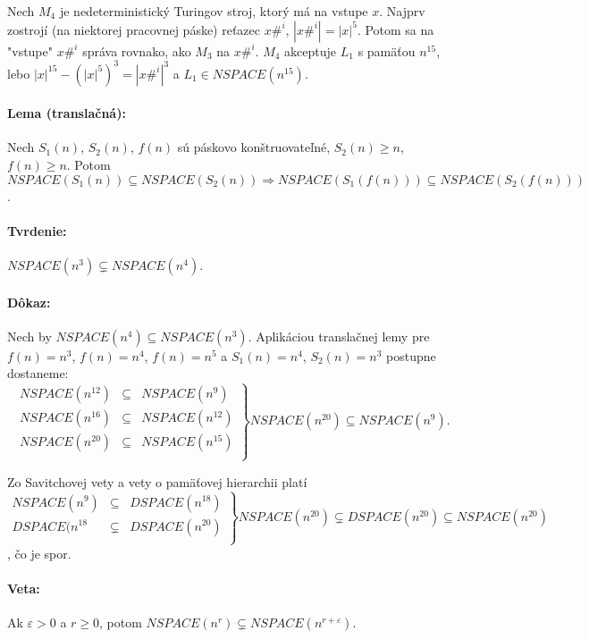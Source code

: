 \documentclass{article}
\begin{document}
\par Nech $M_4$ je nedeterministický Turingov stroj, ktorý má na vstupe $x$.
Najprv zostrojí (na niektorej pracovnej páske) reťazec $x\#^i$, $|x\#^i| = |x|^5$.
Potom sa na "vstupe" $x\#^i$ správa rovnako, ako $M_3$ na $x\#^i$. $M_4$ akceptuje
$L_1$ s pamäťou $n^{15}$, lebo $|x|^{15} - (|x|^5)^3 = |x\#^i|^3$ a  $L_1 \in
NSPACE(n^{15})$.

\paragraph{Lema (translačná):} Nech $S_1(n)$, $S_2(n)$, $f(n)$ sú páskovo
konštruovateľné, $S_2(n) \geq n$, $f(n) \geq n$. Potom $NSPACE(S_1(n)) \subseteq
NSPACE(S_2(n)) \Rightarrow NSPACE(S_1(f(n))) \subseteq NSPACE(S_2(f(n)))$.

\paragraph{Tvrdenie:} $NSPACE(n^3) \subsetneq NSPACE(n^4)$.
\paragraph{Dôkaz:} Nech by $NSPACE(n^4) \subseteq NSPACE(n^3)$. Aplikáciou
translačnej lemy pre $f(n)=n^3$, $f(n)=n^4$, $f(n)=n^5$ a $S_1(n)=n^4$,
$S_2(n)=n^3$ postupne dostaneme:
$$ 
\left.
\begin{array}{lll}
	NSPACE(n^{12}) & \subseteq & NSPACE(n^9) \\
	NSPACE(n^{16}) & \subseteq & NSPACE(n^{12}) \\
	NSPACE(n^{20}) & \subseteq & NSPACE(n^{15}) \\
\end{array} 
\right\}
NSPACE(n^{20}) \subseteq NSPACE(n^9).
$$

Zo Savitchovej vety a vety o pamäťovej hierarchii platí
$$
\left.
\begin{array}{lll}
	NSPACE(n^9) &\subseteq& DSPACE(n^{18}) \\
	DSPACE(n^{18}& \subsetneq& DSPACE(n^{20}) \\
\end{array}
\right\} NSPACE(n^{20}) \subsetneq DSPACE(n^{20}) \subseteq NSPACE(n^{20})
$$, čo je spor.

\paragraph{Veta:} Ak $\varepsilon > 0$ a $r \geq 0$, potom $NSPACE(n^r)
\subsetneq NSPACE(n^{r+\varepsilon})$.
\end{document}
